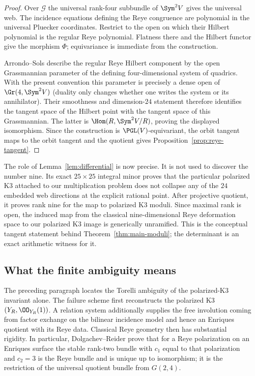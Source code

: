 \begin{proof}
Over \(\mathcal G\) the universal rank-four subbundle of
\(\Sym^2V\) gives the universal web.  The incidence equations defining
the Reye congruence are polynomial in the universal Pluecker
coordinates.  Restrict to the open on which their Hilbert polynomial
is the regular Reye polynomial.  Flatness there and the Hilbert
functor give the morphism \(\Phi\); equivariance is immediate from
the construction.

Arrondo--Sols describe the regular Reye Hilbert component by the open
Grassmannian parameter of the defining four-dimensional system of
quadrics.  With the present convention this parameter is precisely a
dense open of \(\Gr(4,\Sym^2V)\) (duality only changes whether one
writes the system or its annihilator).  Their smoothness and
dimension-\(24\) statement therefore identifies the tangent space of
the Hilbert point with the tangent space of this Grassmannian.  The
latter is \(\Hom(R,\Sym^2V/R)\), proving the displayed isomorphism.
Since the construction is \(\PGL(V)\)-equivariant, the orbit tangent
maps to the orbit tangent and the quotient gives
Proposition~\ref{prop:reye-tangent}.
\end{proof}

The role of Lemma~\ref{lem:differential} is now precise.  It is not
used to discover the number nine.  Its exact $25\times25$ integral
minor proves that the particular polarized K3 attached to our
multiplication problem does not collapse any of the $24$ embedded
web directions at the explicit rational point.  After projective
quotient, it proves rank nine for the map to polarized K3 moduli.
Since maximal rank is open, the induced map from the classical
nine-dimensional Reye deformation space to our polarized K3 image is
generically unramified.  This is the conceptual tangent statement
behind Theorem~\ref{thm:main-moduli}; the determinant is an exact
arithmetic witness for it.

\subsection{What the finite ambiguity means}

The preceding paragraph locates the Torelli ambiguity of the
polarized-K3 invariant alone.
The failure scheme first reconstructs the polarized K3
$(Y_R,\OO_{Y_R}(1))$.  A relation system additionally supplies the
free involution coming from factor exchange on the bilinear incidence
model and hence an Enriques quotient with its Reye data.  Classical
Reye geometry then has substantial rigidity.  In particular,
Dolgachev--Reider prove that for a Reye polarization on an Enriques
surface the stable rank-two bundle with
$c_1$ equal to that polarization and $c_2=3$ is the Reye bundle and
is unique up to isomorphism; it is the restriction of the universal
quotient bundle from $G(2,4)$.

